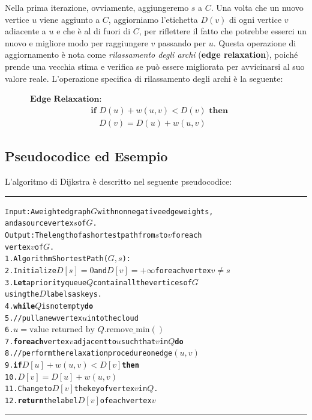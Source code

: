 Nella prima iterazione, ovviamente, aggiungeremo $s$ a $C$. Una volta che un nuovo vertice $u$ viene aggiunto a $C$, aggiorniamo l'etichetta $D(v)$ di ogni vertice $v$ adiacente a $u$ e che è al di fuori di $C$, per riflettere il fatto che potrebbe esserci un nuovo e migliore modo per raggiungere $v$ passando per $u$. Questa operazione di aggiornamento è nota come \emph{rilassamento degli archi} (\textbf{edge relaxation}), poiché prende una vecchia stima e verifica se può essere migliorata per avvicinarsi al suo valore reale. L'operazione specifica di rilassamento degli archi è la seguente:

\vspace{1\baselineskip}
$\quad \quad \quad \textbf{Edge Relaxation:}$
$$
\begin{aligned}
    &\textbf{if } D(u) + w(u,v) < D(v) \textbf{ then} \\
    &\quad D(v) = D(u) + w(u,v)
\end{aligned}
$$

\clearpage
\subsection{Pseudocodice ed Esempio}
L'algoritmo di Dijkstra è descritto nel seguente pseudocodice:
\vspace{1\baselineskip}
\hrule
\begin{alltt}
Input: A weighted graph \(G\) with nonnegative edge weights, 
       and a source vertex \(s\) of \(G\).
Output: The length of a shortest path from \(s\) to \(v\) for each 
        vertex \(v\) of \(G\).
1.  Algorithm ShortestPath(\(G, s\)):   
2.      Initialize \(D[s] = 0\) and \(D[v] = +\infty\) for each vertex \(v \neq s\)
3.      \textbf{Let} a priority queue \(Q\) contain all the vertices of \(G\) 
            using the \(D\) labels as keys.
4.      \textbf{while} \(Q\) is not empty \textbf{do}
5.          // pull a new vertex \(u\) into the cloud
6.          \(u = \text{value returned by } Q.\text{remove\_min}()\)
7.          \textbf{for each} vertex \(v\) adjacent to \(u\) such that \(v\) in \(Q\) \textbf{do}
8.              // perform the relaxation procedure on edge \((u,v)\)
9.              \textbf{if} \(D[u] + w(u,v) < D[v]\) \textbf{then}
10.                 \(D[v] = D[u] + w(u,v)\)
11.                 Change to \(D[v]\) the key of vertex \(v\) in \(Q\).
12.     \textbf{return} the label \(D[v]\) of each vertex \(v\)                                  
\end{alltt}
\hrule 
\vspace{1\baselineskip}

